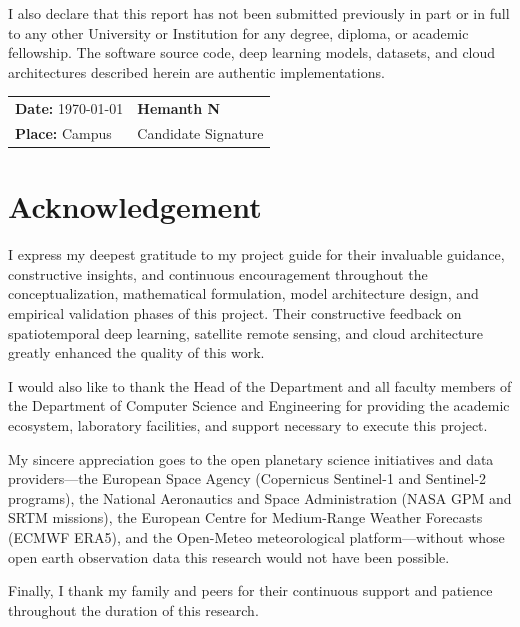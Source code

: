 \documentclass[12pt,a4paper,oneside]{report}
\begin{document}
I also declare that this report has not been submitted previously in part or in full to any other University or Institution for any degree, diploma, or academic fellowship. The software source code, deep learning models, datasets, and cloud architectures described herein are authentic implementations.

\vspace{3.0cm}

\noindent
\begin{tabular}{p{7.5cm}p{7.5cm}}
\textbf{Date:} \today & \textbf{Hemanth N} \\
\textbf{Place:} Campus & Candidate Signature \\
\end{tabular}

\newpage
\chapter*{Acknowledgement}
\thispagestyle{plain}

I express my deepest gratitude to my project guide for their invaluable guidance, constructive insights, and continuous encouragement throughout the conceptualization, mathematical formulation, model architecture design, and empirical validation phases of this project. Their constructive feedback on spatiotemporal deep learning, satellite remote sensing, and cloud architecture greatly enhanced the quality of this work.

I would also like to thank the Head of the Department and all faculty members of the Department of Computer Science and Engineering for providing the academic ecosystem, laboratory facilities, and support necessary to execute this project.

My sincere appreciation goes to the open planetary science initiatives and data providers---the European Space Agency (Copernicus Sentinel-1 and Sentinel-2 programs), the National Aeronautics and Space Administration (NASA GPM and SRTM missions), the European Centre for Medium-Range Weather Forecasts (ECMWF ERA5), and the Open-Meteo meteorological platform---without whose open earth observation data this research would not have been possible.

Finally, I thank my family and peers for their continuous support and patience throughout the duration of this research.
\end{document}
